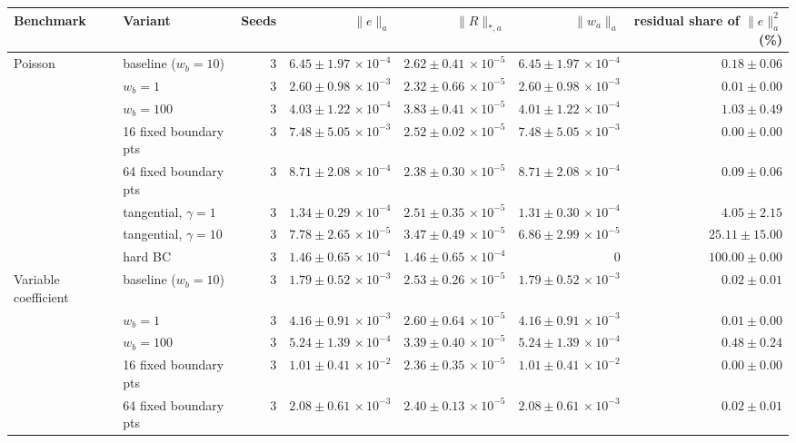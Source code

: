 \begin{tabular}{llrrrrr}
\toprule
Benchmark & Variant & Seeds & $\|e\|_a$ & $\|R\|_{*,a}$ & $\|w_a\|_a$ & residual share of $\|e\|_a^2$ (\%) \\
\midrule
Poisson & baseline ($w_b{=}10$) & 3 & $6.45\pm1.97\,\times\!10^{-4}$ & $2.62\pm0.41\,\times\!10^{-5}$ & $6.45\pm1.97\,\times\!10^{-4}$ & $0.18\pm0.06$ \\
 & $w_b{=}1$ & 3 & $2.60\pm0.98\,\times\!10^{-3}$ & $2.32\pm0.66\,\times\!10^{-5}$ & $2.60\pm0.98\,\times\!10^{-3}$ & $0.01\pm0.00$ \\
 & $w_b{=}100$ & 3 & $4.03\pm1.22\,\times\!10^{-4}$ & $3.83\pm0.41\,\times\!10^{-5}$ & $4.01\pm1.22\,\times\!10^{-4}$ & $1.03\pm0.49$ \\
 & 16 fixed boundary pts & 3 & $7.48\pm5.05\,\times\!10^{-3}$ & $2.52\pm0.02\,\times\!10^{-5}$ & $7.48\pm5.05\,\times\!10^{-3}$ & $0.00\pm0.00$ \\
 & 64 fixed boundary pts & 3 & $8.71\pm2.08\,\times\!10^{-4}$ & $2.38\pm0.30\,\times\!10^{-5}$ & $8.71\pm2.08\,\times\!10^{-4}$ & $0.09\pm0.06$ \\
 & tangential, $\gamma{=}1$ & 3 & $1.34\pm0.29\,\times\!10^{-4}$ & $2.51\pm0.35\,\times\!10^{-5}$ & $1.31\pm0.30\,\times\!10^{-4}$ & $4.05\pm2.15$ \\
 & tangential, $\gamma{=}10$ & 3 & $7.78\pm2.65\,\times\!10^{-5}$ & $3.47\pm0.49\,\times\!10^{-5}$ & $6.86\pm2.99\,\times\!10^{-5}$ & $25.11\pm15.00$ \\
 & hard BC & 3 & $1.46\pm0.65\,\times\!10^{-4}$ & $1.46\pm0.65\,\times\!10^{-4}$ & 0 & $100.00\pm0.00$ \\
\midrule
Variable coefficient & baseline ($w_b{=}10$) & 3 & $1.79\pm0.52\,\times\!10^{-3}$ & $2.53\pm0.26\,\times\!10^{-5}$ & $1.79\pm0.52\,\times\!10^{-3}$ & $0.02\pm0.01$ \\
 & $w_b{=}1$ & 3 & $4.16\pm0.91\,\times\!10^{-3}$ & $2.60\pm0.64\,\times\!10^{-5}$ & $4.16\pm0.91\,\times\!10^{-3}$ & $0.01\pm0.00$ \\
 & $w_b{=}100$ & 3 & $5.24\pm1.39\,\times\!10^{-4}$ & $3.39\pm0.40\,\times\!10^{-5}$ & $5.24\pm1.39\,\times\!10^{-4}$ & $0.48\pm0.24$ \\
 & 16 fixed boundary pts & 3 & $1.01\pm0.41\,\times\!10^{-2}$ & $2.36\pm0.35\,\times\!10^{-5}$ & $1.01\pm0.41\,\times\!10^{-2}$ & $0.00\pm0.00$ \\
 & 64 fixed boundary pts & 3 & $2.08\pm0.61\,\times\!10^{-3}$ & $2.40\pm0.13\,\times\!10^{-5}$ & $2.08\pm0.61\,\times\!10^{-3}$ & $0.02\pm0.01$ \\

\end{tabular}
